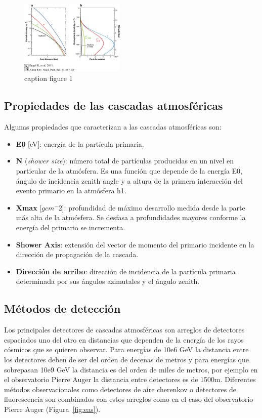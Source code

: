 \begin{figure}
    \centering
    \includegraphics[width=50mm,scale=0.5]{Figures/logitudinaldistribution.jpeg}
    \decoRule
    \caption[logitudinaldist]{caption figure 1}
    \label{fig:logitudinaldist}
\end{figure}

\subsection{Propiedades de las cascadas atmosféricas}

Algunas propiedades que caracterizan a las cascadas atmosféricas son:

\begin{itemize}
    \item \textbf{E0} [eV]: energía de la partícula primaria. 
    \item \textbf{N} (\emph{shower size}): número total de partículas producidas en un nivel en particular de la atmósfera. Es una función que depende de la energía E0, ángulo de incidencia zenith angle y a altura de la primera interacción del evento primario en la atmósfera h1.
    \item \textbf{Xmax} [$gcm^-2$]: profundidad de máximo desarrollo medida desde la parte más alta de la atmósfera. Se desfasa a profundidades mayores conforme la energía del primario se incrementa.
    \item \textbf{Shower Axis}: extensión del vector de momento del primario incidente en la dirección de propagación de la cascada.
    \item \textbf{Dirección de arribo}: dirección de incidencia de la partícula primaria determinada por sus ángulos azimutales y el ángulo zenith.
\end{itemize}

\subsection{Métodos de detección}

Los principales detectores de cascadas atmosféricas son arreglos de detectores espaciados uno del otro en distancias que dependen de la energía de los rayos cósmicos que se quieren observar. Para energías de 10e6 GeV la distancia entre los detectores deben de ser del orden de decenas de metros y para energías que sobrepasan 10e9 GeV la distancia es del orden de miles de metros, por ejemplo en el observatorio Pierre Auger la distancia entre detectores es de 1500m. Diferentes métodos observacionales como detectores de aire cherenkov o detectores de fluorescencia son combinados con estos arreglos como en el caso del observatorio Pierre Auger (Figura~\ref{fig:eas}).

